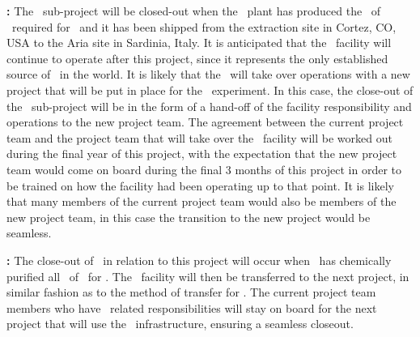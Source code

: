 \textbf{\Urania:} The \Urania\ sub-project will be closed-out when the \Urania\ plant has produced the \UraniaTotalDSkProduction\ of \UAr\ required for \DSks\ and it has been shipped from the extraction site in Cortez, CO, USA to the Aria site in Sardinia, Italy. It is anticipated that the \Urania\ facility will continue to operate after this project, since it represents the only established source of \UAr\ in the world.  It is likely that the \GADMC\ will take over operations with a new project that will be put in place for the \Argo\ experiment.  In this case, the close-out of the \Urania\ sub-project will be in the form of a hand-off of the facility responsibility and operations to the new project team.  The agreement between the current project team and the project team that will take over the \Urania\ facility will be worked out during the final year of this project, with the expectation that the new project team would come on board during the final 3 months of this project in order to be trained on how the facility had been operating up to that point.  It is likely that many members of the current project team would also be members of the new project team, in this case the transition to the new project would be seamless.

\textbf{\Aria:} The close-out of \Aria\ in relation to this project will occur when \SeruciOne\ has chemically purified all \UraniaTotalDSkProduction\ of \UAr\ for \DSks.  The \Aria\ facility will then be transferred to the next project, in similar fashion as to the method of transfer for \Urania.  The current project team members who have \Aria\ related responsibilities will stay on board for the next project that will use the \Aria\ infrastructure, ensuring a seamless closeout.


